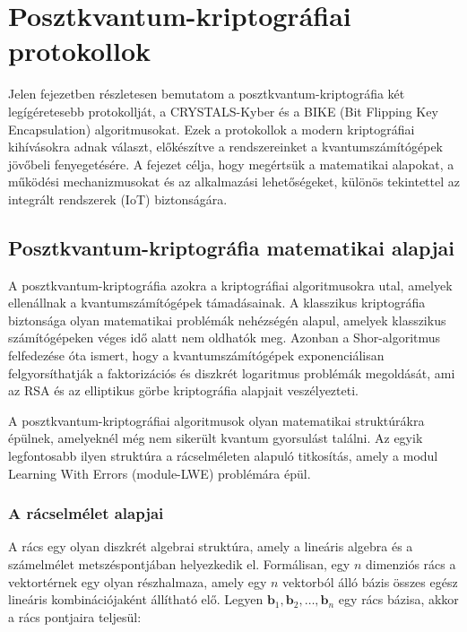 \chapter{Posztkvantum-kriptográfiai protokollok}


Jelen fejezetben részletesen bemutatom a posztkvantum-kriptográfia két legígéretesebb protokollját, 
a CRYSTALS-Kyber és a BIKE (Bit Flipping Key Encapsulation) algoritmusokat. Ezek a protokollok 
a modern kriptográfiai kihívásokra adnak választ, előkészítve a rendszereinket a kvantumszámítógépek 
jövőbeli fenyegetésére. A fejezet célja, hogy megértsük a matematikai alapokat, a működési 
mechanizmusokat és az alkalmazási lehetőségeket, különös tekintettel az integrált rendszerek 
(IoT) biztonságára.


\section{Posztkvantum-kriptográfia matematikai alapjai}


A posztkvantum-kriptográfia azokra a kriptográfiai algoritmusokra utal, amelyek ellenállnak a 
kvantumszámítógépek támadásainak. A klasszikus kriptográfia biztonsága olyan matematikai problémák 
nehézségén alapul, amelyek klasszikus számítógépeken véges idő alatt nem oldhatók meg. Azonban a 
Shor-algoritmus felfedezése óta ismert, hogy a kvantumszámítógépek exponenciálisan felgyorsíthatják 
a faktorizációs és diszkrét logaritmus problémák megoldását, ami az RSA és az elliptikus görbe 
kriptográfia alapjait veszélyezteti.

A posztkvantum-kriptográfiai algoritmusok olyan matematikai struktúrákra épülnek, amelyeknél még nem 
sikerült kvantum gyorsulást találni. Az egyik legfontosabb ilyen struktúra a rácselméleten alapuló 
titkosítás, amely a modul Learning With Errors (module-LWE) problémára épül.

\subsection{A rácselmélet alapjai}

A rács egy olyan diszkrét algebrai struktúra, amely a lineáris algebra és a számelmélet metszéspontjában 
helyezkedik el. Formálisan, egy $n$ dimenziós rács a vektortérnek egy olyan részhalmaza, amely 
egy $n$ vektorból álló bázis összes egész lineáris kombinációjaként állítható elő. Legyen $\mathbf{b}_1, 
\mathbf{b}_2, \ldots, \mathbf{b}_n$ egy rács bázisa, akkor a rács pontjaira teljesül:

